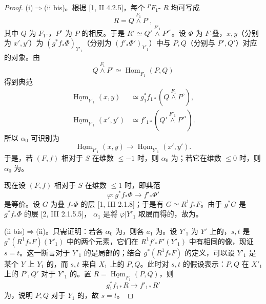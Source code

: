 \begin{proof}
(i)$\Rightarrow$(ii bis)。根据 [1, II 4.2.5]，每个 ${}^PF_1$- $R$ 均可写成
\[R=Q\overset{F_1}{\wedge}P^\circ,\]
其中 $Q$ 为 $F_1$-，$P^\circ$ 为 $P$ 的相反。于是 $R'\simeq Q'\overset{F'_1}{\wedge}P'^\circ$。设 $\Phi$ 为 $F$-叠，$x,y$（分别为 $x',y'$）为 $(g^*f_*\Phi)_{Y'_1}$（分别为 $(f'_*\Phi')_{Y'_1}$）中与 $P,Q$（分别与 $P',Q'$）对应的对象。由
\[Q\overset{F_1}{\wedge}P^\circ\simeq\underline{\operatorname{Hom}}_{F_1}(P,Q)\]
得到典范
\[
\begin{aligned}
\underline{\operatorname{Hom}}_{Y'_1}(x,y)&\simeq g_1^*f_{1*}(Q\overset{F_1}{\wedge}P^\circ),\\
\underline{\operatorname{Hom}}_{Y'_1}(x',y')&\simeq f'_{1*}(Q'\overset{F'_1}{\wedge}P'^\circ).
\end{aligned}
\]
所以 $\alpha_0$ 可识别为
\[\underline{\operatorname{Hom}}_{Y'_1}(x,y)\longrightarrow\underline{\operatorname{Hom}}_{Y'_1}(x',y').\]
于是，若 $(F,f)$ 相对于 $S$ 在维数 $\leqslant-1$ 时，则 $\alpha_0$ 为；若它在维数 $\leqslant0$ 时，则 $\alpha_0$ 为。

现在设 $(F,f)$ 相对于 $S$ 在维数 $\leqslant1$ 时，即典范
\[\varphi:g^*f_*\Phi\longrightarrow f'_*\Phi'\]
是等价。设 $G$ 为叠 $f_*\Phi$ 的层 [1, III 2.1.8]；于是有 $G\simeq R^1f_*F$。由于 $g^*G$ 是 $g^*f_*\Phi$ 的层 [2, III 2.1.5.5]， $\alpha_1$ 是将 $\varphi|Y'_1$ 取层而得的，故为。

(ii bis)$\Rightarrow$(ii)。只需证明：若各 $\alpha_0$ 为，则各 $a_1$ 为。设 $Y'_1$ 为 $Y'$ 上的，$s,t$ 是 $g^*(R^1f_*F)(Y'_1)$ 中的两个元素，它们在 $R^1f'_*F'(Y'_1)$ 中有相同的像，现证 $s=t$。这一断言对于 $Y'_1$ 的是局部的；结合 $g^*(R^1f_*F)$ 的定义，可以设 $Y'_1$ 是某个 $Y$ 上 $Y_1$ 的，而 $s,t$ 来自 $X_1$ 上的 $P,Q$。此时对 $s,t$ 的假设表示：$P,Q$ 在 $X'_1$ 上的 $P',Q'$ 对于 $Y'_1$ 的。置 $R=\underline{\operatorname{Hom}}_{F_1}(P,Q)$，则
\[g_1^*f_{1*}R\longrightarrow f'_{1*}R'\]
为，说明 $P,Q$ 对于 $Y_1$ 的，故 $s=t$。


\end{proof}
